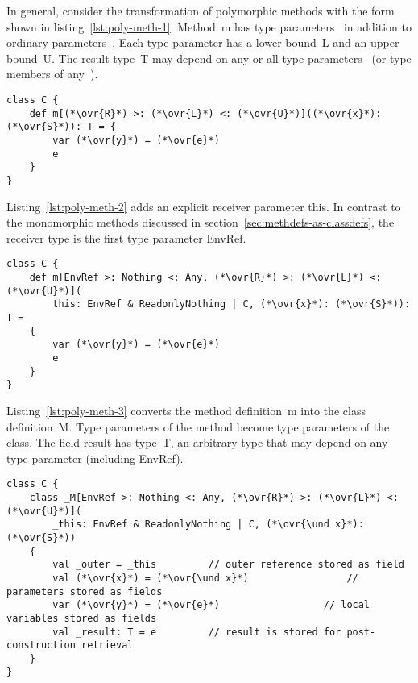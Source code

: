 In general, consider the transformation of polymorphic methods with the form shown in listing~\ref{lst:poly-meth-1}. Method~{\cd m} has type parameters~{\cd {}} in addition to ordinary parameters~{\cd {}}. Each type parameter has a lower bound~{\cd L} and an upper bound~{\cd U}. The result type~{\cd T} may depend on any or all type parameters~{\cd {}} (or type members of any~{\cd {}}).

\begin{lstlisting}[float=htbp, caption={Polymorphic Method Transformation 1}, label={lst:poly-meth-1}]
class C {
	def m[(*\ovr{R}*) >: (*\ovr{L}*) <: (*\ovr{U}*)]((*\ovr{x}*): (*\ovr{S}*)): T = {
		var (*\ovr{y}*) = (*\ovr{e}*)
		e
	}
}
\end{lstlisting}

Listing~\ref{lst:poly-meth-2} adds an explicit receiver parameter {\cd this}. In contrast to the monomorphic methods discussed in section~\ref{sec:methdefs-as-classdefs}, the receiver type is the first type parameter {\cd EnvRef}.

\begin{lstlisting}[float=htbp, caption={Polymorphic Method Transformation 2 (Explicit This)}, label={lst:poly-meth-2}]
class C {
	def m[EnvRef >: Nothing <: Any, (*\ovr{R}*) >: (*\ovr{L}*) <: (*\ovr{U}*)](
		this: EnvRef & ReadonlyNothing | C, (*\ovr{x}*): (*\ovr{S}*)): T =
	{
		var (*\ovr{y}*) = (*\ovr{e}*)
		e
	}
}
\end{lstlisting}

Listing~\ref{lst:poly-meth-3} converts the method definition~{\cd m} into the class definition~{\cd \und M}. Type parameters of the method become type parameters of the class. The field {\cd \und result} has type~{\cd T}, an arbitrary type that may depend on any type parameter (including {\cd EnvRef}).

\begin{lstlisting}[float=htbp, caption={Polymorphic Method Transformation 3 (Closure)}, label={lst:poly-meth-3}]
class C {
	class _M[EnvRef >: Nothing <: Any, (*\ovr{R}*) >: (*\ovr{L}*) <: (*\ovr{U}*)](
		_this: EnvRef & ReadonlyNothing | C, (*\ovr{\und x}*): (*\ovr{S}*))
	{
		val _outer = _this         // outer reference stored as field
		val (*\ovr{x}*) = (*\ovr{\und x}*)                 // parameters stored as fields
		var (*\ovr{y}*) = (*\ovr{e}*)                  // local variables stored as fields
		val _result: T = e         // result is stored for post-construction retrieval
	}
}
\end{lstlisting}



